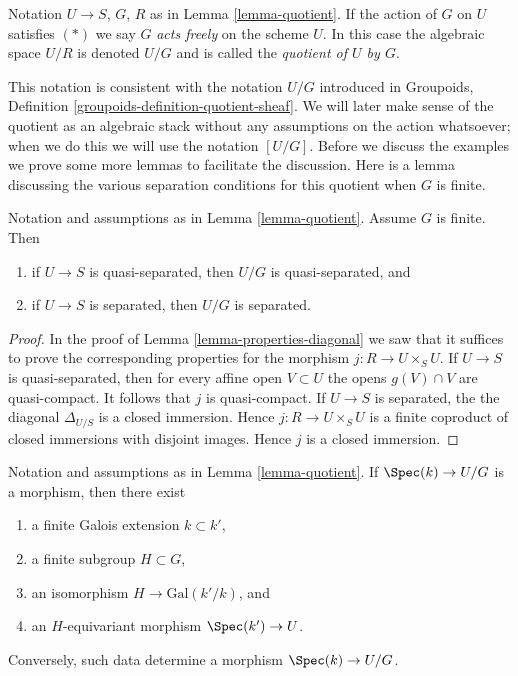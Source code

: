 \begin{definition}
\label{definition-quotient}
Notation $U \to S$, $G$, $R$ as in Lemma \ref{lemma-quotient}.
If the action of $G$ on $U$ satisfies $(*)$ we say $G$ {\it acts freely}
on the scheme $U$. In this case the algebraic space $U/R$ is denoted
$U/G$ and is called the {\it quotient of $U$ by $G$}.
\end{definition}

\noindent
This notation is consistent with the notation $U/G$ introduced in
Groupoids, Definition \ref{groupoids-definition-quotient-sheaf}.
We will later make sense of the quotient as an algebraic stack without
any assumptions on the action whatsoever; when we do this we will use the
notation $[U/G]$. Before we discuss the examples we prove
some more lemmas to facilitate the discussion. Here is a lemma discussing the
various separation conditions for this quotient when $G$ is finite.

\begin{lemma}
\label{lemma-quotient-finite-separated}
Notation and assumptions as in Lemma \ref{lemma-quotient}.
Assume $G$ is finite. Then
\begin{enumerate}
\item if $U \to S$ is quasi-separated, then $U/G$ is quasi-separated, and
\item if $U \to S$ is separated, then $U/G$ is separated.
\end{enumerate}
\end{lemma}

\begin{proof}
In the proof of Lemma \ref{lemma-properties-diagonal}
we saw that it suffices to prove the
corresponding properties for the morphism $j : R \to U \times_S U$.
If $U \to S$ is quasi-separated, then for every affine open $V \subset U$
the opens $g(V) \cap V$ are quasi-compact. It follows that $j$ is
quasi-compact.
If $U \to S$ is separated, the the diagonal $\Delta_{U/S}$ is a closed
immersion. Hence $j : R \to U \times_S U$ is a finite coproduct
of closed immersions with disjoint images. Hence $j$ is a closed immersion.
\end{proof}

\begin{lemma}
\label{lemma-quotient-field-map}
Notation and assumptions as in Lemma \ref{lemma-quotient}.
If $\Spec(k) \to U/G$ is a morphism, then there exist
\begin{enumerate}
\item a finite Galois extension $k \subset k'$,
\item a finite subgroup $H \subset G$,
\item an isomorphism $H \to \text{Gal}(k'/k)$, and
\item an $H$-equivariant morphism $\Spec(k') \to U$.
\end{enumerate}
Conversely, such data determine a morphism $\Spec(k) \to U/G$.
\end{lemma}

